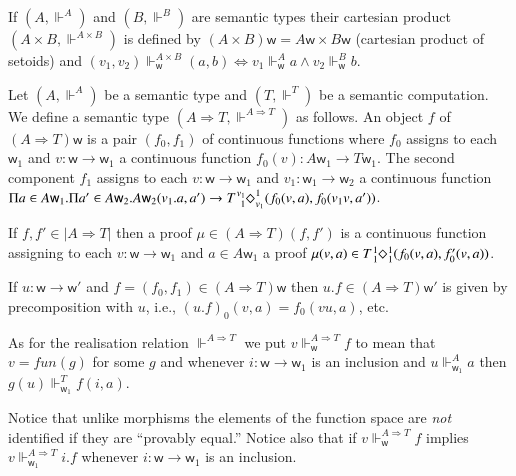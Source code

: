 \documentclass[orivec]{llncs}
\newcommand{\sq}[4]{\tensor*[^{#1}_{#2}]{\Diamond}{^{#3}_{#4}}}
\newcommand{\funn}[1]{\textit{fun}(#1)}
\newcommand\w{\ensuremath{\mathsf{w}}\xspace}
\begin{document}
\begin{definition}
If $(A,\Vdash^A)$ and $(B,\Vdash^B)$ are semantic types their cartesian product $(A\times B,\Vdash^{A\times B})$ is defined by $(A\times B)\w=A\w\times B\w$ (cartesian product of setoids) and $(v_1,v_2)\Vdash_\w^{A\times B}(a,b)\iff v_1\Vdash_\w^{A}a\wedge v_2\Vdash_\w^{B}b$. 
\end{definition}
\begin{definition}
  Let $(A,\Vdash^A)$ be a semantic type and $(T,\Vdash^T)$ be a
  semantic computation. We define a semantic type $(A{\Rightarrow}T,
  \Vdash^{A{\Rightarrow}T})$ as follows.  
  An object $f$ of $(A{\Rightarrow} T)\w$ is a pair $(f_0,f_1)$ of
  continuous functions where $f_0$ assigns to each $\w_1$ and
  $v:\w\rightarrow \w_1$ a continuous function $f_0(v):A\w_1\rightarrow
  T\w_1$. The second component $f_1$ assigns to each
  $v:\w\rightarrow \w_1$ and $v_1:\w_1\rightarrow \w_2$ a continuous
  function $\Pi a\in A\w_1.\Pi a'\in A\w_2.A\w_2(v_1.a,a')\rightarrow
  T\sq{v_1}{1}{1}{v_1}(f_0(v,a),f_0(v_1v,a'))$.


  If $f,f'\in |A{\Rightarrow}T|$ then a proof $\mu\in
  (A{\Rightarrow}T)(f,f')$ is a continuous function assigning to each
  $v:\w\rightarrow \w_1$ and $a\in A\w_1$ a proof $\mu(v,a)\in
  T\sq{1}{1}{1}{1}(f_0(v,a), f_0'(v,a))$.

  If $u:\w\rightarrow \w'$ and $f=(f_0,f_1)\in (A{\Rightarrow}T)\w$
  then $u.f\in (A{\Rightarrow}T)\w'$ is given by precomposition with
  $u$, i.e., $(u.f)_0(v,a)=f_0(vu,a)$, etc.



  As for the realisation relation $\Vdash^{A{\Rightarrow}T}$ we put
  $v\Vdash^{A{\Rightarrow}T}_\w f$ to mean that $v=\funn g$ for some
  $g$ and whenever $i:\w\rightarrow \w_1$ is an inclusion and
  $u\Vdash^A_{\w_1}a$ then $g(u)\Vdash^T_{\w_1} f(i,a)$.
\end{definition}
Notice that unlike morphisms the elements of the function space are
\emph{not} identified if they are ``provably equal.''
Notice also that if $v\Vdash^{A{\Rightarrow} T}_\w f$ implies
$v\Vdash^{A{\Rightarrow}T}_{\w_1}i.f$ whenever $i:\w\rightarrow \w_1$
is an inclusion.
\end{document}
